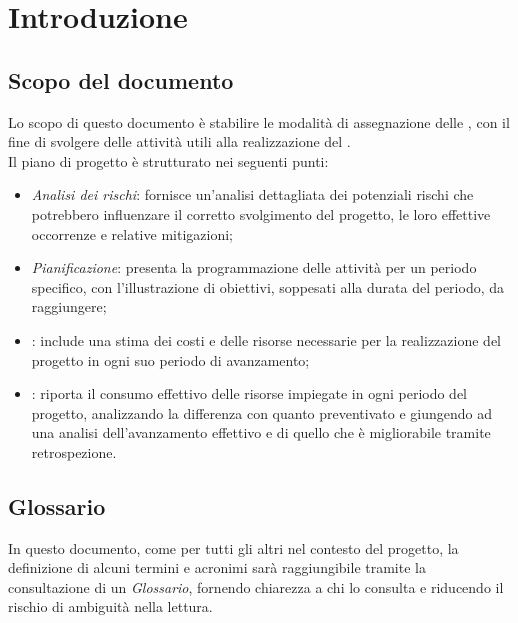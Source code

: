 \chapter{Introduzione}\label{chap:intro}

\section{Scopo del documento}
Lo scopo di questo documento è stabilire le modalità di assegnazione delle , con il fine di svolgere delle attività utili alla realizzazione del .\\Il piano di progetto è strutturato nei seguenti punti:
\begin{itemize}
    \item \textit{Analisi dei rischi}: fornisce un'analisi dettagliata dei potenziali rischi che potrebbero influenzare il corretto svolgimento del progetto, le loro effettive occorrenze e relative mitigazioni;
    \item \textit{Pianificazione}: presenta la programmazione delle attività per un periodo specifico, con l'illustrazione di obiettivi, soppesati alla durata del periodo, da raggiungere;
    \item \textit{}: include una stima dei costi e delle risorse necessarie per la realizzazione del progetto in ogni suo periodo di avanzamento;
    \item \textit{}: riporta il consumo effettivo delle risorse impiegate in ogni periodo del progetto, analizzando la differenza con quanto preventivato e giungendo ad una analisi dell'avanzamento effettivo e di quello che è migliorabile tramite retrospezione.
\end{itemize}


\section{Glossario}
In questo documento, come per tutti gli altri nel contesto del progetto, la definizione di alcuni termini e acronimi sarà raggiungibile tramite la consultazione di un \textit{Glossario}, fornendo chiarezza a chi lo consulta e riducendo il rischio di ambiguità nella lettura.
